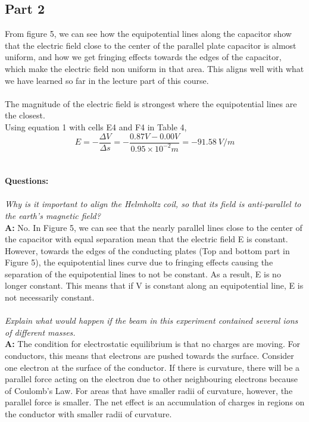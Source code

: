 \documentclass[letterpaper]{article}
\begin{document}
\subsection{Part 2}
From figure 5, we can see how the equipotential lines along the capacitor show that the
electric field close to the center of the parallel plate capacitor is almost uniform, and
how we get fringing effects towards the edges of the capacitor, which make the electric field non uniform
in that area. This aligns well with what we have learned so far in the lecture part of this course.
\\ \\
The magnitude of the electric field is strongest where the equipotential lines are the closest.\\
Using equation 1 with cells E4 and F4 in Table 4,
$$ E=-\frac{\Delta V}{\Delta s}= -\frac{0.87 V -0.00 V}{0.95\times 10^{-2} m} = -91.58 \:V/m $$
\\ \\
\textbf{Questions: }\\ \\
\textit{Why is it important to align the Helmholtz coil, so that its field is
        anti-parallel to the earth's magnetic field?}\\
\textbf{A:}
No. In Figure 5, we can see that
the nearly parallel lines close to the center of the capacitor with equal separation mean that the electric field E is constant.
However, towards the edges of the conducting plates (Top and bottom part in Figure 5), the equipotential lines
curve due to fringing effects causing the separation of the equipotential lines to not be constant. As a result, E is no longer constant.
This means that if V is constant along an equipotential line,
E is not necessarily constant.\\ \\
\textit{Explain what would happen if the beam in this experiment contained several ions of different masses.}\\
\textbf{A:}
The condition for electrostatic equilibrium is that no charges are moving. For conductors, this means
that electrons are pushed towards the surface. Consider one electron at the surface of the conductor.
If there is curvature, there will be a parallel force acting on the electron due to other neighbouring
electrons because of Coulomb's Law. For areas that have smaller radii of curvature, however, the
parallel force is smaller. The net effect is an accumulation of charges in regions on the conductor with
smaller radii of curvature.
\end{document}
